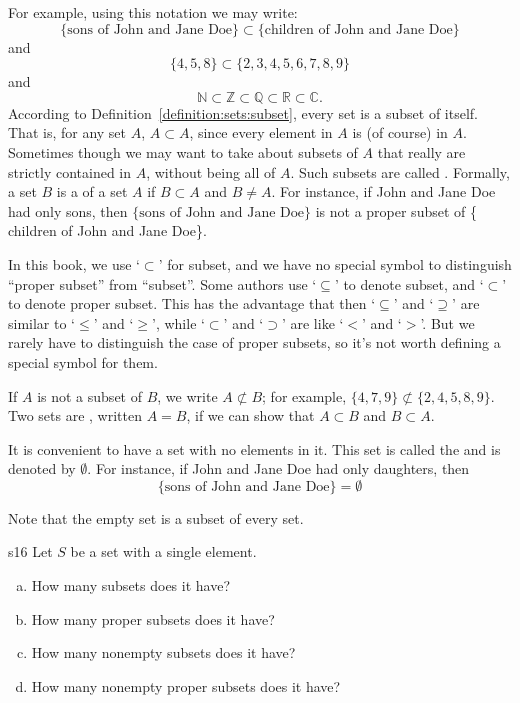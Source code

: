 For example, using this notation we may write:
\[
\{\text{sons of John and Jane Doe}\} \subset \{\text{children of John and Jane Doe\}}
\]
and 
\[
\{4,5,8\} \subset \{2, 3, 4, 5, 6, 7, 8, 9 \}
\]
and
\[
{\mathbb N} \subset {\mathbb Z} \subset {\mathbb Q} \subset {\mathbb R} \subset {\mathbb C}.
\]
According to Definition~\ref{definition:sets:subset}, every set is a subset of itself.  That is, for any set $A$, $A \subset A$, since every element in $A$ is (of course) in $A$.  Sometimes though we may want to take about subsets of $A$ that really are strictly contained in $A$, without being all of $A$. Such subsets are called . Formally, a set $B$ is a  of a set $A$ if $B \subset A$ and $B \neq A$. For instance, if John and Jane Doe had only sons, then
$\{\textrm{sons of John and Jane Doe}\}$ is not a proper subset of \{ children of John and Jane Doe\}.

\begin{rem} 
In this book, we use `$\subset$' for subset, and we have no special symbol to distinguish ``proper subset'' from ``subset''.
Some authors use  `$\subseteq$' to denote  subset, and  `$\subset$' to denote proper subset. This has the advantage that then `$\subseteq$' and `$\supseteq$' are similar to `$\le$' and `$\ge$', while `$\subset$' and `$\supset$' are like `$<$' and `$>$'.
But we rarely have to distinguish the case of proper subsets, so it's not worth defining a special symbol for them.
\end{rem}

If $A$ is not a subset of $B$, we write $A \not \subset B$; for example, $\{4, 7, 9\} \not \subset \{2, 4, 5,  8, 9 \}$.  Two sets are , written $A = B$, if we can show that $A \subset B$ and $B \subset A$.  

It is convenient to have a set with no elements in it.  This set is called the  and is denoted by $\emptyset$\label{theemptyset}.  For instance, if John and Jane Doe had only daughters, then
\[
\mbox{\{sons of John and Jane Doe\}} = \emptyset
\]

Note that the empty set is a subset of every set.  

\begin{exercise}{s16}
Let $S$ be a set with a single element.
\begin{enumerate}[(a)]
\item
How many subsets does it have?
\item
How many proper subsets does it have?
\item
How many nonempty subsets does it have?
\item
How many nonempty proper subsets does it have?
\end{enumerate}
\end{exercise}


